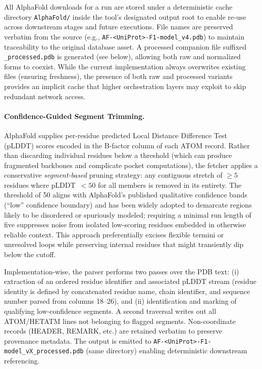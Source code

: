 All AlphaFold downloads for a run are stored under a deterministic cache directory \texttt{AlphaFold/} inside the tool's designated output root to enable re-use across downstream stages and future executions. File names are preserved verbatim from the source (e.g., \texttt{AF-<UniProt>-F1-model\_v4.pdb}) to maintain traceability to the original database asset. A processed companion file suffixed \texttt{\_processed.pdb} is generated (see below), allowing both raw and normalized forms to coexist. While the current implementation always overwrites existing files (ensuring freshness), the presence of both raw and processed variants provides an implicit cache that higher orchestration layers may exploit to skip redundant network access.

\paragraph{Confidence-Guided Segment Trimming.} AlphaFold supplies per-residue predicted Local Distance Difference Test (pLDDT) scores encoded in the B-factor column of each ATOM record. Rather than discarding individual residues below a threshold (which can produce fragmented backbones and complicate pocket computations), the fetcher applies a conservative \emph{segment-based} pruning strategy: any contiguous stretch of $\ge 5$ residues where \mbox{pLDDT $< 50$} for all members is removed in its entirety. The threshold of 50 aligns with AlphaFold's published qualitative confidence bands (``low'' confidence boundary) and has been widely adopted to demarcate regions likely to be disordered or spuriously modeled; requiring a minimal run length of five suppresses noise from isolated low-scoring residues embedded in otherwise reliable context. This approach preferentially excises flexible termini or unresolved loops while preserving internal residues that might transiently dip below the cutoff.

Implementation-wise, the parser performs two passes over the PDB text: (i) extraction of an ordered residue identifier and associated pLDDT stream (residue identity is defined by concatenated residue name, chain identifier, and sequence number parsed from columns 18--26), and (ii) identification and marking of qualifying low-confidence segments. A second traversal writes out all ATOM/HETATM lines not belonging to flagged segments. Non-coordinate records (HEADER, REMARK, etc.) are retained verbatim to preserve provenance metadata. The output is emitted to \texttt{AF-<UniProt>-F1-model\_vX\_processed.pdb} (same directory) enabling deterministic downstream referencing.

